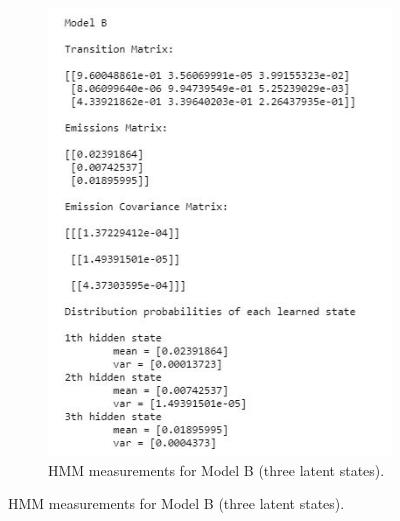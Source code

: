 \begin{figure}[H]
\begin{subfigure}[b]{0.45\textwidth}
                 \includegraphics[width=\textwidth]{imgs/model_b_regime.JPG}
        \caption{HMM measurements for Model B (three latent states).}
         \label{fig:model_b_regime}
     \end{subfigure}
\end{figure}



